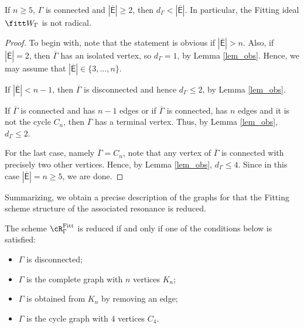 \documentclass[10pt, leqno]{amsart}
\begin{document}
\begin{prop} \label{prop_neredus}
If $n \ge 5$,  $\Gamma$ is connected and $| \overline{\mathsf{E}} | \ge 2$, then $d_\Gamma < | \overline{\mathsf{E}} |$. In particular, the Fitting ideal $\fitt W_\Gamma$ is not radical.
\end{prop}

\begin{proof}
To begin with, note that the statement is obvious if $| \overline{\mathsf{E}} | > n$. Also, if $| \overline{\mathsf{E}} | = 2$, then $\overline{\Gamma}$ has an isolated vertex, so $d_\Gamma = 1$, by Lemma \ref{lem_obs}. Hence, we may assume that $| \overline{\mathsf{E}} | \in \{3, \ldots, n\}$.

If $| \overline{\mathsf{E}} | < n - 1$, then $\overline{\Gamma}$ is disconnected and hence $d_\Gamma \le 2$, by Lemma \ref{lem_obs}.

If $\overline{\Gamma}$ is connected and has $n - 1$ edges or if $\overline{\Gamma}$ is connected, has $n$ edges and it is not the cycle $C_n$, then $\overline{\Gamma}$ has a terminal vertex. Thus, by Lemma \ref{lem_obs}, $d_\Gamma \le 2$.

For the last case, namely $\overline{\Gamma} = C_n$, note that any vertex of $\overline{\Gamma}$ is connected with precisely two other vertices. Hence, by Lemma \ref{lem_obs}, $d_\Gamma \le 4$. Since in this case $| \overline{\mathsf{E}} | = n \ge 5$, we are done.
\end{proof}

Summarizing, we obtain a precise description of the graphs for that the Fitting scheme structure of the associated resonance is reduced.

\begin{thm} \label{thm_fitting}
The scheme $\cR^{\operatorname{Fitt}}_\Gamma$ is reduced if and only if one of the conditions below is satisfied:
\begin{itemize}
    \item [(i)] $\Gamma$ is disconnected;
    \item [(ii)] $\Gamma$ is the complete graph with $n$ vertices $K_n$;
    \item [(iii)] $\Gamma$ is obtained from $K_n$ by removing an edge;
    \item [(iv)] $\Gamma$ is the cycle graph with $4$ vertices $C_4$.
\end{itemize}
\end{thm}
\end{document}
